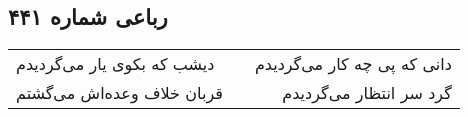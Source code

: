 \begin{center}
\section*{رباعی شماره ۴۴۱}
\label{sec:sh441}
\begin{longtable}{l p{0.5cm} r}
دیشب که بکوی یار می‌گردیدم
&&
دانی که پی چه کار می‌گردیدم
\\
قربان خلاف وعده‌اش می‌گشتم
&&
گرد سر انتظار می‌گردیدم
\\
\end{longtable}
\end{center}
